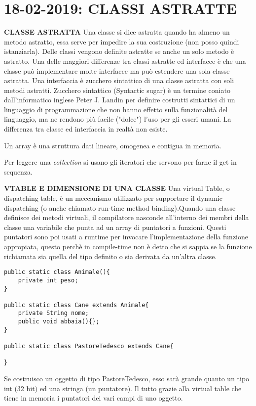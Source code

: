 
\newpage
\section{18-02-2019: CLASSI ASTRATTE}
\textbf{CLASSE ASTRATTA} \newline
Una classe si dice astratta quando ha almeno un metodo astratto, essa serve per impedire la sua costruzione (non posso quindi istanziarla). Delle classi vengono definite astratte se anche un solo metodo è astratto. Una delle maggiori differenze tra classi astratte ed interfacce è che una classe può implementare molte interfacce ma può estendere una sola classe astratta. Una interfaccia è zucchero sintattico di una classe astratta con soli metodi astratti. Zucchero sintattico (Syntactic sugar) è un termine coniato dall'informatico inglese Peter J. Landin per definire costrutti sintattici di un linguaggio di programmazione che non hanno effetto sulla funzionalità del linguaggio, ma ne rendono più facile ("dolce") l'uso per gli esseri umani. La differenza tra classe ed interfaccia in realtà non esiste.

\noindent Un array è una struttura dati lineare, omogenea e contigua in memoria.

\noindent Per leggere una \textit{collection} si usano gli iteratori che servono per farne il get in sequenza.

\noindent \textbf{VTABLE E DIMENSIONE DI UNA CLASSE} \newline
Una virtual Table, o dispatching table, è un meccanismo utilizzato per supportare il dynamic dispatching (o anche chiamato run-time method binding).Quando una classe definisce dei metodi virtuali, il compilatore nasconde all'interno dei membri della classe una variabile che punta ad un array di puntatori a funzioni. Questi puntatori sono poi usati a runtime per invocare l'implementazione della funzione appropiata, questo perchè in compile-time non è detto che si sappia se la funzione richiamata sia quella del tipo definito o sia derivata da un'altra classe.

\begin{lstlisting}[basicstyle=\small,]
public static class Animale(){
	private int peso;
}

public static class Cane extends Animale{
	private String nome;
	public void abbaia(){};
}

public static class PastoreTedesco extends Cane{

}
\end{lstlisting}
Se costruisco un oggetto di tipo PastoreTedesco, esso sarà grande quanto un tipo int (32 bit) ed una stringa (un puntatore).
Il tutto grazie alla virtual table che tiene in memoria i puntatori dei vari campi di uno oggetto.






